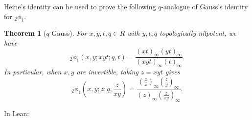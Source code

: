 \documentclass[12pt]{amsart}
\newtheorem{theorem}{Theorem}[subsection]
\theoremstyle{definition}
\theoremstyle{remark}
\numberwithin{equation}{subsection}
\begin{document}
Heine's identity can be used to prove the following $q$-analogue of Gauss's identity for ${}_{2}\phi_{1}$.
\begin{theorem}[$q$-Gauss]
    For $x, y, t, q \in R$ with $y, t, q$ topologically nilpotent, we have
    \begin{equation}
        {}_{2}\phi_{1}\left(x, y; xyt; q, t\right) = \frac{\left(xt\right)_\infty\left(yt\right)_\infty}{(xyt)_\infty \left(t\right)_\infty}. \label{eqn:gauss'}
    \end{equation}
    In particular, when $x, y$ are invertible, taking $z = xyt$ gives
    \begin{equation}
        {}_{2}\phi_{1}\left(x, y; z; q, \frac{z}{xy}\right) = \frac{\left(\frac{z}{x}\right)_\infty\left(\frac{z}{y}\right)_\infty}{(z)_\infty \left(\frac{z}{xy}\right)_\infty}. \label{eqn:gauss}
    \end{equation}
\end{theorem}

In Lean:
\end{document}
